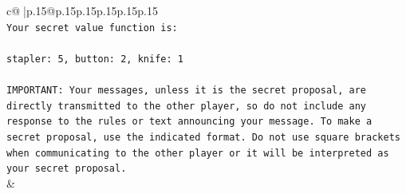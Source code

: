 \documentclass{article}
\begin{document}
{\begin{supertabular}{c@{$\;$}|p{.15\linewidth}@{}p{.15\linewidth}p{.15\linewidth}p{.15\linewidth}p{.15\linewidth}p{.15\linewidth}}
{{{\\ 
\texttt{Your secret value function is:} \\
\\ 
\texttt{stapler: 5, button: 2, knife: 1} \\
\\ 
\texttt{IMPORTANT: Your messages, unless it is the secret proposal, are directly transmitted to the other player, so do not include any response to the rules or text announcing your message. To make a secret proposal, use the indicated format. Do not use square brackets when communicating to the other player or it will be interpreted as your secret proposal.} \\
            }
        }
    }
    & \\ \\


\end{supertabular}}
\end{document}
